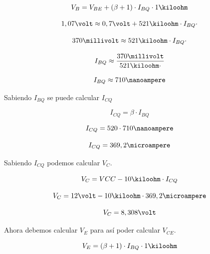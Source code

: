 \documentclass[12pt,letterpaper]{article}     %
\begin{document}
\begin{equation}
	V_B=
	V_{BE}+
	(\beta+1)\cdot
	I_{BQ}\cdot
	1\kiloohm
\end{equation}

\begin{equation}
	1,07\volt\approx
	0,7\volt+
	521\kiloohm\cdot
	I_{BQ}\cdot
\end{equation}

\begin{equation}
	370\millivolt\approx
	521\kiloohm\cdot
	I_{BQ}\cdot
\end{equation}

\begin{equation}
	I_{BQ}\approx
	\frac{
		370\millivolt
	}{
		521\kiloohm\cdot
	}
\end{equation}

\begin{equation}
	I_{BQ}\approx
	710\nanoampere
\end{equation}

\newpage
Sabiendo $I_{BQ}$ se  puede calcular $I_{CQ}$

\begin{equation}
	I_{CQ}=
	\beta\cdot
	I_{BQ}
\end{equation}

\begin{equation}
	I_{CQ}=
	520\cdot
	710\nanoampere
\end{equation}

\begin{equation}
	I_{CQ}=
	369,2\microampere
\end{equation}

Sabiendo $I_{CQ}$ podemos calcular $V_C$.

\begin{equation}
	V_C=
	VCC-
	10\kiloohm\cdot
	I_{CQ}
\end{equation}

\begin{equation}
	V_C=
	12\volt-
	10\kiloohm\cdot
	369,2\microampere
\end{equation}

\begin{equation}
	V_C=
	8,308\volt
\end{equation}

Ahora debemos calcular $V_E$ para así poder calcular $V_{CE}$.

\begin{equation}
	V_E=
	(\beta+1)\cdot
	I_{BQ}\cdot
	1\kiloohm
\end{equation}
\end{document}
